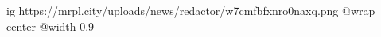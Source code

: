  
 
 
 
 

\ifcmt
  ig https://mrpl.city/uploads/news/redactor/w7cmfbfxnro0naxq.png
  @wrap center
  @width 0.9
\fi
